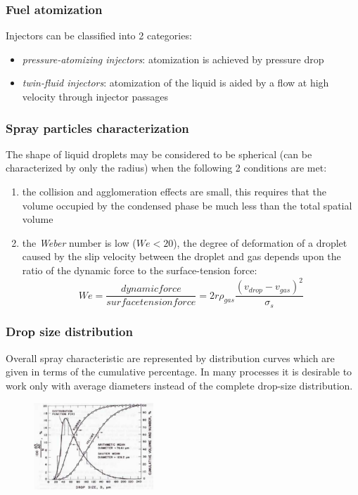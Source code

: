 \documentclass[12pt]{article}
\begin{document}
\subsubsection{Fuel atomization}

Injectors can be classified into 2 categories:

\begin{itemize}
    \item \textit{pressure-atomizing injectors}: atomization is achieved by pressure drop
    \item \textit{twin-fluid injectors}: atomization of the liquid is aided by a flow at high velocity through injector passages
\end{itemize}


\subsubsection{Spray particles characterization}

The shape of liquid droplets may be considered to be spherical (can be characterized by only the radius) when the following 2 conditions are met:
\begin{enumerate}
    \item the collision and agglomeration effects are small, this requires that the volume occupied by the condensed phase be much less than the total spatial volume
    \item the \textit{Weber} number is low ($We<20$), the degree of deformation of a droplet caused by the slip velocity between the droplet and gas depends upon the ratio of the dynamic force to the surface-tension force:
    \begin{equation}
        We = \frac{dynamic force}{surface tension force} = 2r\rho_{gas}\frac{(v_{drop}-v_{gas})^{2}}{\sigma_{s}}
    \end{equation}
\end{enumerate}

\subsubsection{Drop size distribution}

Overall spray characteristic are represented by distribution curves which are given in terms of the cumulative percentage. In many processes it is desirable to work only with average diameters instead of the complete drop-size distribution.

\begin{figure}[h!]
\centering
\includegraphics[width=0.4\textwidth]{figures/distribution.png}
\end{figure}
\end{document}
